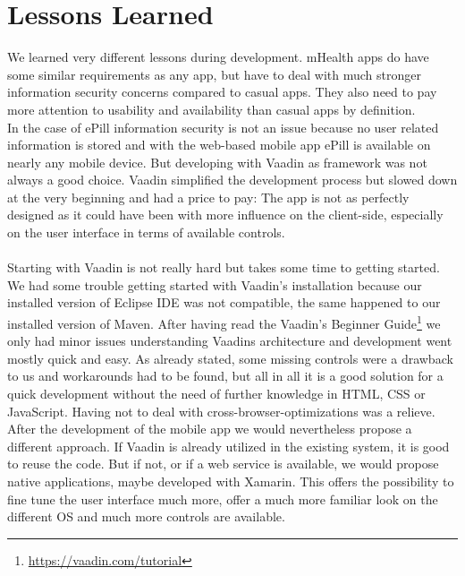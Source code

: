 \section{Lessons Learned}
\label{sec:LessonsLearned}
We learned very different lessons during development. mHealth apps do have some similar requirements as any app, but have to deal with much stronger information security concerns compared to casual apps. They also need to pay more attention to usability and availability than casual apps by definition. 
\\
In the case of ePill information security is not an issue because no user related information is stored and with the web-based mobile app ePill is available on nearly any mobile device. But developing with Vaadin as framework was not always a good choice. Vaadin simplified the development process but slowed down at the very beginning and had a price to pay: The app is not as perfectly designed as it could have been with more influence on the client-side, especially on the user interface in terms of available controls.
\\
\\
Starting with Vaadin is not really hard but takes some time to getting started. We had some trouble getting started with Vaadin's installation because our installed version of Eclipse IDE was not compatible, the same happened to our installed version of Maven. After having read the Vaadin's Beginner Guide\footnote{\url{https://vaadin.com/tutorial}} we only had minor issues understanding Vaadins architecture and development went mostly quick and easy. As already stated, some missing controls were a drawback to us and workarounds had to be found, but all in all it is a good solution for a quick development without the need of further knowledge in HTML, CSS or JavaScript. Having not to deal with cross-browser-optimizations was a relieve.
\\
After the development of the mobile app we would nevertheless propose a different approach. If Vaadin is already utilized in the existing system, it is good to reuse the code. But if not, or if a web service is available, we would propose native applications, maybe developed with Xamarin. This offers the possibility to fine tune the user interface much more, offer a much more familiar look on the different OS and much more controls are available.